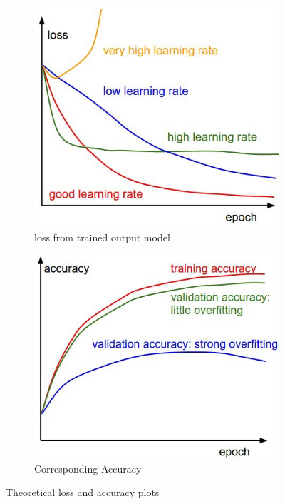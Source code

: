 \begin{figure}[H]
     \centering
     \begin{subfigure}[b]{0.4\textwidth}
         \centering
         \includegraphics[width=\textwidth]{figure_4/loss.jpeg}
         \caption{loss from trained output model}
         \label{fig:y equals x}
     \end{subfigure}
     \hfill
     \begin{subfigure}[b]{0.4\textwidth}
         \centering
         \includegraphics[width=\textwidth]{figure_4/accuracy.jpeg}
         \caption{Corresponding Accuracy}
         \label{fig:three sin x}
     \end{subfigure}

        \caption{Theoretical loss and accuracy plots\cite{ml_68}}
        \label{fig:training_and_accuracy_theo}
\end{figure}



